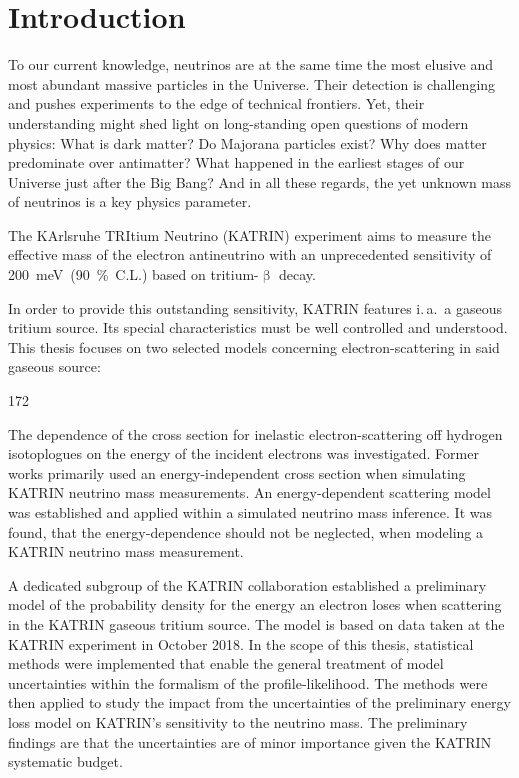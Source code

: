 \chapter{Introduction}
To our current knowledge, neutrinos are at the same time the most elusive and most abundant massive particles in the Universe. Their detection is challenging and pushes experiments to the edge of technical frontiers. Yet, their understanding might shed light on long-standing open questions of modern physics: What is dark matter? Do Majorana particles exist? Why does matter predominate over antimatter? What happened in the earliest stages of our Universe just after the Big Bang? And in all these regards, the yet unknown mass of neutrinos is a key physics parameter.

The KArlsruhe TRItium Neutrino (KATRIN) experiment aims to measure the effective mass of the electron antineutrino with an unprecedented sensitivity of \mbox{\SI{200}{meV} (\SI{90}{\percent} C.L.)} based on tritium-$\upbeta$ decay. 

In order to provide this outstanding sensitivity, KATRIN features i.\,a.~a gaseous tritium source. Its special characteristics must be well controlled and understood. This thesis focuses on two selected models concerning electron-scattering in said gaseous source: 
\begin{dingautolist}{172}
	\item\label{itm:introductionEDepCrossSec} The dependence of the cross section for inelastic electron-scattering off hydrogen isotoplogues on the energy of the incident electrons was investigated. Former works primarily used an energy-independent cross section when simulating KATRIN neutrino mass measurements. An energy-dependent scattering model was established and applied within a simulated neutrino mass inference. It was found, that the energy-dependence should not be neglected, when modeling a KATRIN neutrino mass measurement.
	\item\label{itm:introductionKatrinEloss} A dedicated subgroup of the KATRIN collaboration established a preliminary model of the probability density for the energy an electron loses when scattering in the KATRIN gaseous tritium source. The model is based on data taken at the KATRIN experiment in October 2018. In the scope of this thesis, statistical methods were implemented that enable the general treatment of model uncertainties within the formalism of the profile-likelihood. The methods were then applied to study the impact from the uncertainties of the preliminary energy loss model on KATRIN's sensitivity to the neutrino mass. The preliminary findings are that the uncertainties are of minor importance given the KATRIN systematic budget.
\end{dingautolist}

